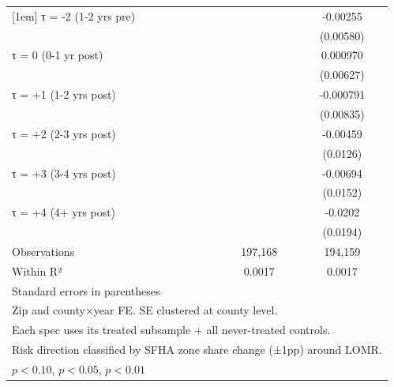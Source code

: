 \begin{table}[htbp]
\begin{tabular}{l*{2}{c}}
[1em]
τ = -2 (1-2 yrs pre)&                     &    -0.00255         \\
                    &                     &   (0.00580)         \\
[1em]
τ = 0 (0-1 yr post) &                     &    0.000970         \\
                    &                     &   (0.00627)         \\
[1em]
τ = +1 (1-2 yrs post)&                     &   -0.000791         \\
                    &                     &   (0.00835)         \\
[1em]
τ = +2 (2-3 yrs post)&                     &    -0.00459         \\
                    &                     &    (0.0126)         \\
[1em]
τ = +3 (3-4 yrs post)&                     &    -0.00694         \\
                    &                     &    (0.0152)         \\
[1em]
τ = +4 (4+ yrs post)&                     &     -0.0202         \\
                    &                     &    (0.0194)         \\
\hline
Observations        &     197,168         &     194,159         \\
Within R²           &      0.0017         &      0.0017         \\
\hline\hline
\multicolumn{3}{l}{\footnotesize Standard errors in parentheses}\\
\multicolumn{3}{l}{\footnotesize Zip and county×year FE. SE clustered at county level.}\\
\multicolumn{3}{l}{\footnotesize Each spec uses its treated subsample + all never-treated controls.}\\
\multicolumn{3}{l}{\footnotesize Risk direction classified by SFHA zone share change (±1pp) around LOMR.}\\
\multicolumn{3}{l}{\footnotesize \sym{*} \(p<0.10\), \sym{**} \(p<0.05\), \sym{***} \(p<0.01\)}\\
\end{tabular}
\end{table}
